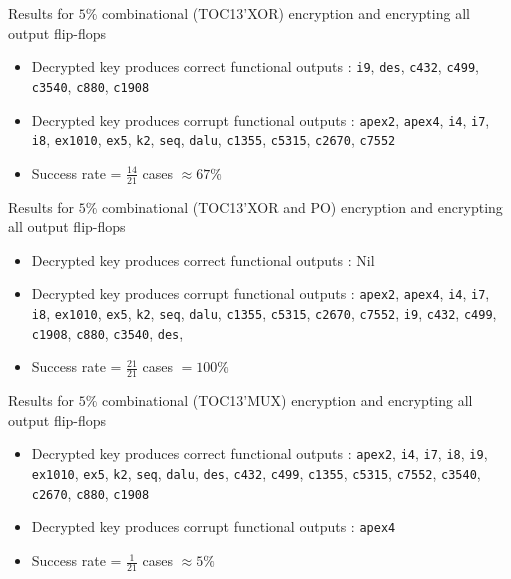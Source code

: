 \begin{frame}{Results for $5\%$ combinational (TOC13'XOR) encryption and encrypting all output flip-flops}
\begin{itemize}
\item Decrypted key produces correct functional outputs :  \texttt{i9}, \texttt{des}, \texttt{c432}, \texttt{c499}, \texttt{c3540}, \texttt{c880}, \texttt{c1908}
\item Decrypted key produces corrupt functional outputs : \texttt{apex2}, \texttt{apex4}, \texttt{i4}, \texttt{i7}, \texttt{i8}, \texttt{ex1010}, \texttt{ex5}, \texttt{k2}, \texttt{seq}, \texttt{dalu}, \texttt{c1355}, \texttt{c5315}, \texttt{c2670}, \texttt{c7552} 
\item Success rate = $\frac{14}{21}$ cases \alert{$\approx 67\%$}
\end{itemize}
\end{frame}


\begin{frame}{Results for $5\%$ combinational (TOC13'XOR and PO) encryption and encrypting all output flip-flops}
\begin{itemize}
\item Decrypted key produces correct functional outputs :  \alert{Nil}  
\item Decrypted key produces corrupt functional outputs : \texttt{apex2}, \texttt{apex4}, \texttt{i4}, \texttt{i7}, \texttt{i8}, \texttt{ex1010}, \texttt{ex5}, \texttt{k2}, \texttt{seq}, \texttt{dalu}, \texttt{c1355}, \texttt{c5315}, \texttt{c2670}, \texttt{c7552}, \texttt{i9}, \texttt{c432}, \texttt{c499}, \texttt{c1908}, \texttt{c880}, \texttt{c3540}, \texttt{des},
\item Success rate = $\frac{21}{21}$ cases \alert{$= 100\%$}
\end{itemize}
\end{frame}


\begin{frame}{Results for $5\%$ combinational (TOC13'MUX) encryption and encrypting all output flip-flops}
\begin{itemize}
\item Decrypted key produces correct functional outputs : \texttt{apex2}, \texttt{i4}, \texttt{i7}, \texttt{i8}, \texttt{i9}, \texttt{ex1010}, \texttt{ex5}, \texttt{k2}, \texttt{seq}, \texttt{dalu}, \texttt{des}, \texttt{c432}, \texttt{c499}, \texttt{c1355}, \texttt{c5315}, \texttt{c7552}, \texttt{c3540}, \texttt{c2670}, \texttt{c880}, \texttt{c1908}
\item Decrypted key produces corrupt functional outputs : \texttt{apex4}
\item Success rate = $\frac{1}{21}$ cases \alert{$\approx 5\%$}
\end{itemize}
\end{frame}

